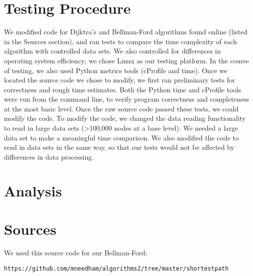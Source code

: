 \documentclass{article}
\begin{document}
\section{Testing Procedure}
We modified code for Dijktra's and Bellman-Ford algorithms found online (listed in the Sources section), and ran tests to compare the time complexity of each algorithm with controlled data sets.  We also controlled for differences in operating system efficiency; we chose Linux as our testing platform.  In the course of testing, we also used Python metrics tools (cProfile and time).  Once we located the source code we chose to modify, we first ran preliminary tests for correctness and rough time estimates.  Both the Python time and cProfile tools were run from the command line, to verify program correctness and completeness at the most basic level.  Once the raw source code passed these tests, we could modify the code.
To modify the code, we changed the data reading functionality to read in large data sets (>100,000 nodes at a base level).  We needed a large data set to make a meaningful time comparison.
 We also modified the code to read in data sets in the same way, so that our tests would not be affected by differences in data processing.
\section{Analysis}

\section{Sources}

We used this source code for our Bellman-Ford:
\begin{verbatim}
https://github.com/mneedham/algorithms2/tree/master/shortestpath
\end{verbatim}
\end{document}
